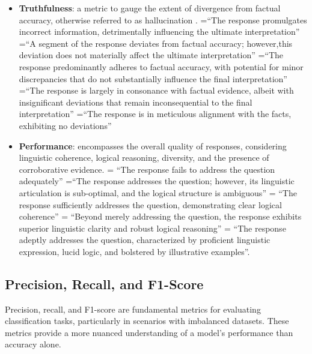                 \begin{quoting}[font={small,itshape},indentfirst=false]
                    \begin{itemize}
                    \item \textbf{Truthfulness}: a metric to gauge the extent of divergence from factual accuracy, otherwise referred to as hallucination \citep{Lin2021}.
                        =“The response promulgates incorrect information, detrimentally influencing the ultimate interpretation”
                        =“A segment of the response deviates from factual accuracy; however,this deviation does not materially affect the ultimate interpretation”
                        =“The response predominantly adheres to factual accuracy, with potential for minor discrepancies that do not substantially influence the final interpretation”
                        =“The response is largely in consonance with factual evidence, albeit with insignificant deviations that remain inconsequential to the final interpretation”
                        =“The response is in meticulous alignment with the facts, exhibiting no deviations”
                                
                    \item \textbf{Performance}: encompasses the overall quality of responses, considering linguistic coherence, logical reasoning, diversity, and the presence of corroborative evidence.
                         = “The response fails to address the question adequately”
                         =“The response addresses the question; however, its linguistic articulation is sub-optimal, and the logical structure is ambiguous”
                         = “The response sufficiently addresses the question, demonstrating clear logical coherence”
                         = “Beyond merely addressing the question, the response exhibits superior linguistic clarity and robust logical reasoning”
                         = “The response adeptly addresses the question, characterized by proficient linguistic expression, lucid logic, and bolstered by illustrative examples”\citep{Lin2021}.         
                    \end{itemize}
                \end{quoting}

            \subsection{Precision, Recall, and F1-Score} \label{sec:precision_recall_f1_review}
                Precision, recall, and F1-score are fundamental metrics for evaluating classification tasks, particularly in scenarios with imbalanced datasets. These metrics provide a more nuanced understanding of a model's performance than accuracy alone.

